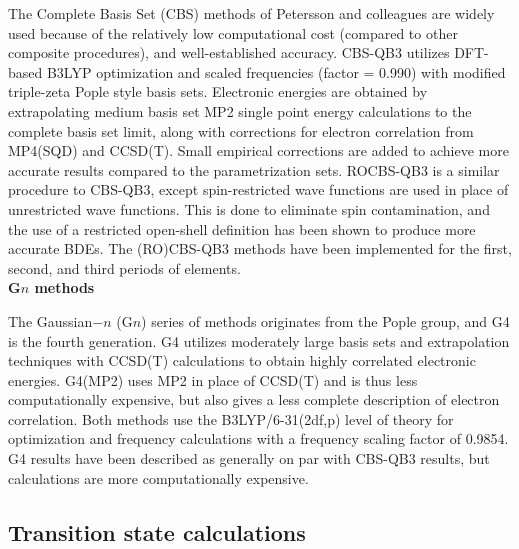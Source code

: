 \begin{doublespace}
The Complete Basis Set (CBS) methods of Petersson and
colleagues\cite{Montgomery1999, Montgomery2000, Ochterski1996, Wood2006} are
widely used because of the relatively low computational cost (compared to other
composite procedures), and well-established accuracy.\cite{Somers2015,
Simmie2015} CBS-QB3\cite{Montgomery1999, Montgomery2000} utilizes DFT-based
B3LYP optimization and scaled frequencies (factor = 0.990) with modified
triple-zeta Pople style basis sets. Electronic energies are obtained by
extrapolating medium basis set MP2 single point energy calculations to the
complete basis set limit, along with corrections for electron correlation from
MP4(SQD) and CCSD(T). Small empirical corrections are added to achieve more
accurate results compared to the parametrization sets.\cite{Petersson2001}
ROCBS-QB3 is a similar procedure to CBS-QB3, except spin-restricted wave
functions are used in place of unrestricted wave functions. This is done to
eliminate spin contamination, and the use of a restricted open-shell definition
has been shown to produce more accurate BDEs.\cite{DiLabio1999} The (RO)CBS-QB3
methods have been implemented for the first, second, and third periods of
elements. \\

\noindent \textbf{G$n$ methods}

The Gaussian$-n$ (G$n$) series of methods originates from the Pople
group,\cite{Pople1989} and G4 is the fourth generation. G4 utilizes moderately
large basis sets and extrapolation techniques with CCSD(T) calculations to
obtain highly correlated electronic energies. G4(MP2) uses MP2 in place of
CCSD(T) and is thus less computationally expensive, but also gives a less
complete description of electron correlation. Both methods use the
B3LYP/6-31(2df,p) level of theory for optimization and frequency calculations
with a frequency scaling factor of 0.9854. G4 results have been described as
generally on par with CBS-QB3 results,\cite{Somers2015, Simmie2015} but
calculations are more computationally expensive.

\subsection{Transition state calculations}


\end{doublespace}
